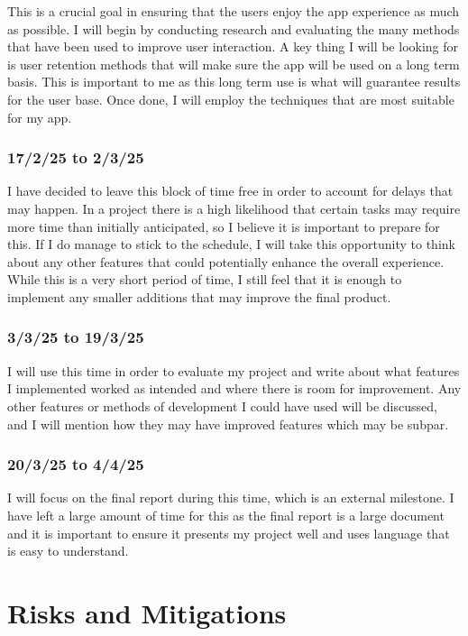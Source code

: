 \documentclass[12pt]{article}
\begin{document}
This is a crucial goal in ensuring that the users enjoy the app experience as much as possible. I will begin by conducting research and evaluating the many methods that have been used to improve user interaction. A key thing I will be looking for is user retention methods that will make sure the app will be used on a long term basis. This is important to me as this long term use is what will guarantee results for the user base. Once done, I will employ the techniques that are most suitable for my app.


\subsubsection{17/2/25 to 2/3/25}
I have decided to leave this block of time free in order to account for delays that may happen. In a project there is a high likelihood that certain tasks may require more time than initially anticipated, so I believe it is important to prepare for this. If I do manage to stick to the schedule, I will take this opportunity to think about any other features that could potentially enhance the overall experience. While this is a very short period of time, I still feel that it is enough to implement any smaller additions that may improve the final product.   


\subsubsection{3/3/25 to 19/3/25}
I will use this time in order to evaluate my project and write about what features I implemented worked as intended and where there is room for improvement.  Any other features or methods of development I could have used will be discussed, and I will mention how they may have improved features which may be subpar.


\subsubsection{20/3/25 to 4/4/25}
I will focus on the final report during this time, which is an external milestone. I have left a large amount of time for this as the final report is a large document and it is important to ensure it presents my project well and uses language that is easy to understand.

\section{Risks and Mitigations}
\end{document}
